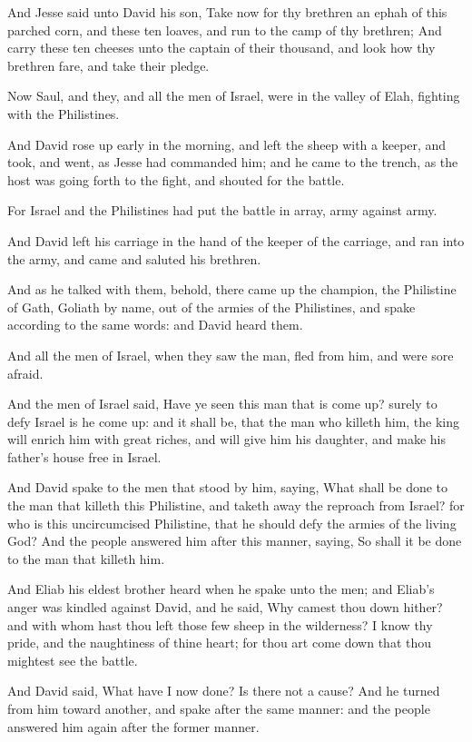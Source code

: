 \verse And Jesse said unto David his son, Take now for thy brethren an ephah of this parched corn, and these ten loaves, and run to the camp of thy brethren; \verse And carry these ten cheeses unto the captain of their thousand, and look how thy brethren fare, and take their pledge.

\verse Now Saul, and they, and all the men of Israel, were in the valley of Elah, fighting with the Philistines.

\verse And David rose up early in the morning, and left the sheep with a keeper, and took, and went, as Jesse had commanded him; and he came to the trench, as the host was going forth to the fight, and shouted for the battle.

\verse For Israel and the Philistines had put the battle in array, army against army.

\verse And David left his carriage in the hand of the keeper of the carriage, and ran into the army, and came and saluted his brethren.

\verse And as he talked with them, behold, there came up the champion, the Philistine of Gath, Goliath by name, out of the armies of the Philistines, and spake according to the same words: and David heard them.

\verse And all the men of Israel, when they saw the man, fled from him, and were sore afraid.

\verse And the men of Israel said, Have ye seen this man that is come up?  surely to defy Israel is he come up: and it shall be, that the man who killeth him, the king will enrich him with great riches, and will give him his daughter, and make his father's house free in Israel.

\verse And David spake to the men that stood by him, saying, What shall be done to the man that killeth this Philistine, and taketh away the reproach from Israel? for who is this uncircumcised Philistine, that he should defy the armies of the living God?  \verse And the people answered him after this manner, saying, So shall it be done to the man that killeth him.

\verse And Eliab his eldest brother heard when he spake unto the men; and Eliab's anger was kindled against David, and he said, Why camest thou down hither? and with whom hast thou left those few sheep in the wilderness? I know thy pride, and the naughtiness of thine heart; for thou art come down that thou mightest see the battle.

\verse And David said, What have I now done? Is there not a cause?  \verse And he turned from him toward another, and spake after the same manner: and the people answered him again after the former manner.

